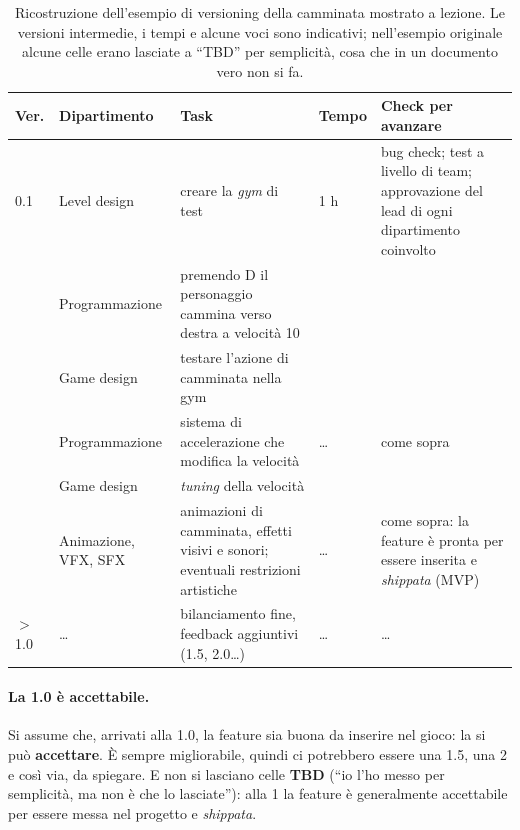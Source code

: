 \begin{table}[htbp]
  \centering
  \caption{Ricostruzione dell'esempio di versioning della camminata mostrato
  a lezione. Le versioni intermedie, i tempi e alcune voci sono indicativi;
  nell'esempio originale alcune celle erano lasciate a ``TBD'' per
  semplicità, cosa che in un documento vero non si fa.}
  \label{gd10:tab:versioning}
  \footnotesize
  \begin{tabular}{@{}p{}p{}p{}p{}p{}@{}}
    \toprule
    \textbf{Ver.} & \textbf{Dipartimento} & \textbf{Task} &
      \textbf{Tempo} & \textbf{Check per avanzare} \\
    \midrule
    0.1 & Level design & creare la \emph{gym} di test & 1 h &
      bug check; test a livello di team; approvazione del lead di ogni
      dipartimento coinvolto \\
        & Programmazione & premendo D il personaggio cammina verso destra
      a velocità 10 & & \\
        & Game design & testare l'azione di camminata nella gym & & \\
    \addlinespace
    0.5 & Programmazione & sistema di accelerazione che modifica la
      velocità & \ldots & come sopra \\
        & Game design & \emph{tuning} della velocità & & \\
    \addlinespace
    1.0 & Animazione, VFX, SFX & animazioni di camminata, effetti visivi e
      sonori; eventuali restrizioni artistiche & \ldots & come sopra:
      la feature è pronta per essere inserita e \emph{shippata} (MVP) \\
    \addlinespace
    $>$1.0 & \ldots & bilanciamento fine, feedback aggiuntivi (1.5,
      2.0\ldots) & \ldots & \ldots \\
    \bottomrule
  \end{tabular}
\end{table}

\paragraph{La 1.0 è accettabile.} Si assume che, arrivati alla 1.0, la
feature sia buona da inserire nel gioco: la si può \textbf{accettare}. È
sempre migliorabile, quindi ci potrebbero essere una 1.5, una 2 e così via,
da spiegare. E non si lasciano celle \textbf{TBD} (``io l'ho messo per
semplicità, ma non è che lo lasciate''): alla 1 la feature è generalmente
accettabile per essere messa nel progetto e \emph{shippata}.

